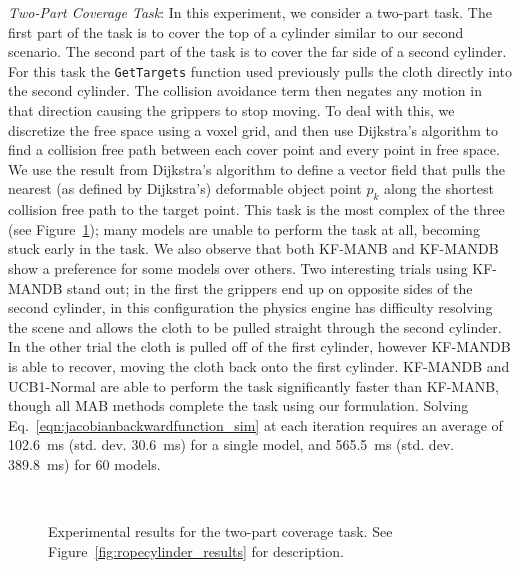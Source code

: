 \textit{Two-Part Coverage Task}: In this experiment, we consider a two-part task. The first part of the task is to cover the top of a cylinder similar to our second scenario. The second part of the task is to cover the far side of a second cylinder. For this task the \texttt{GetTargets} function used previously pulls the cloth directly into the second cylinder. The collision avoidance term then negates any motion in that direction causing the grippers to stop moving. To deal with this, we discretize the free space using a voxel grid, and then use Dijkstra's algorithm to find a collision free path between each cover point and every point in free space. We use the result from Dijkstra's algorithm to define a vector field that pulls the nearest (as defined by Dijkstra's) deformable object point $p_k$ along the shortest collision free path to the target point. This task is the most complex of the three (see Figure~\ref{fig:clothwafr_results}); many models are unable to perform the task at all, becoming stuck early in the task. We also observe that both KF-MANB and KF-MANDB show a preference for some models over others. Two interesting trials using KF-MANDB stand out; in the first the grippers end up on opposite sides of the second cylinder, in this configuration the physics engine has difficulty resolving the scene and allows the cloth to be pulled straight through the second cylinder. In the other trial the cloth is pulled off of the first cylinder, however KF-MANDB is able to recover, moving the cloth back onto the first cylinder. KF-MANDB and UCB1-Normal are able to perform the task significantly faster than KF-MANB, though all MAB methods complete the task using our formulation. Solving Eq.~\eqref{eqn:jacobianbackwardfunction_sim} at each iteration requires an average of 102.6~ms (std. dev. 30.6~ms) for a single model, and 565.5~ms (std. dev. 389.8~ms) for 60 models.

\begin{figure}[t]
    \centering
    \\
    \vspace{-0.15in}
    \vspace{-0.1in}
    \caption{Experimental results for the two-part coverage task. See Figure~\ref{fig:ropecylinder_results} for description.}
    \label{fig:clothwafr_results}
\end{figure}
